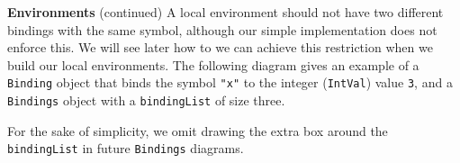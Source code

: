 \begin{minipage}[t]{\sw}
\slidenumber
\LARGE
{\bf Environments} (continued)\exx
A local environment should not have two different bindings with the same symbol,
although our simple implementation does not enforce this.
We will see later how to we can achieve this restriction
when we build our local environments.\exx
The following diagram gives an example
of a \verb'Binding' object
that binds the symbol \verb'"x"' to the integer (\verb'IntVal') value \verb'3',
and a \verb'Bindings' object
with a \verb'bindingList' of size three.\exx
\centerline{}
For the sake of simplicity,
we omit drawing the extra box
around the \verb'bindingList' in future \verb'Bindings' diagrams.
\end{minipage}
\clearpage
